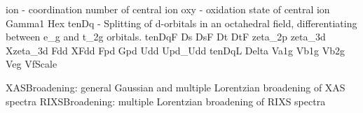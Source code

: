 ion - coordination number of central ion
oxy - oxidation state of central ion
Gamma1
Hex
tenDq - Splitting of d-orbitals in an octahedral field, differentiating between e_g and t_2g orbitals. 
tenDqF
Ds
DsF
Dt
DtF
zeta_2p
zeta_3d
Xzeta_3d
Fdd
XFdd
Fpd
Gpd
Udd
Upd_Udd
tenDqL
Delta
Va1g
Vb1g
Vb2g
Veg
VfScale

XASBroadening: general Gaussian and multiple Lorentzian broadening of XAS spectra
RIXSBroadening: multiple Lorentzian broadening of RIXS spectra
